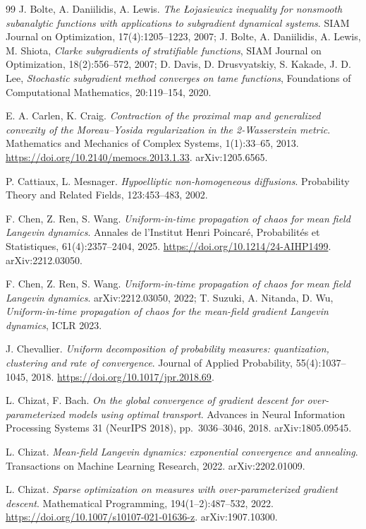 \begin{thebibliography}{99}
J. Bolte, A. Daniilidis, A. Lewis.
\emph{The {\L}ojasiewicz inequality for nonsmooth subanalytic functions with applications to subgradient dynamical
systems}.
SIAM Journal on Optimization, 17(4):1205--1223, 2007;
J. Bolte, A. Daniilidis, A. Lewis, M. Shiota, \emph{Clarke subgradients of stratifiable functions}, SIAM Journal on
Optimization, 18(2):556--572, 2007;
D. Davis, D. Drusvyatskiy, S. Kakade, J. D. Lee, \emph{Stochastic subgradient method converges on tame functions},
Foundations of Computational Mathematics, 20:119--154, 2020.

E. A. Carlen, K. Craig.
\emph{Contraction of the proximal map and generalized convexity of the Moreau--Yosida regularization in the
2-Wasserstein metric}.
Mathematics and Mechanics of Complex Systems, 1(1):33--65, 2013.
\url{https://doi.org/10.2140/memocs.2013.1.33}.
arXiv:1205.6565.

P. Cattiaux, L. Mesnager.
\emph{Hypoelliptic non-homogeneous diffusions}.
Probability Theory and Related Fields, 123:453--483, 2002.

F. Chen, Z. Ren, S. Wang.
\emph{Uniform-in-time propagation of chaos for mean field Langevin dynamics}.
Annales de l'Institut Henri Poincar\'e, Probabilit\'es et Statistiques, 61(4):2357--2404, 2025.
\url{https://doi.org/10.1214/24-AIHP1499}.
arXiv:2212.03050.

F. Chen, Z. Ren, S. Wang.
\emph{Uniform-in-time propagation of chaos for mean field Langevin dynamics}.
arXiv:2212.03050, 2022;
T. Suzuki, A. Nitanda, D. Wu, \emph{Uniform-in-time propagation of chaos for the mean-field gradient Langevin
dynamics}, ICLR 2023.

J. Chevallier.
\emph{Uniform decomposition of probability measures: quantization, clustering and rate of convergence}.
Journal of Applied Probability, 55(4):1037--1045, 2018.
\url{https://doi.org/10.1017/jpr.2018.69}.

L. Chizat, F. Bach.
\emph{On the global convergence of gradient descent for over-parameterized models using optimal transport}.
Advances in Neural Information Processing Systems 31 (NeurIPS 2018), pp.~3036--3046, 2018.
arXiv:1805.09545.

L. Chizat.
\emph{Mean-field Langevin dynamics: exponential convergence and annealing}.
Transactions on Machine Learning Research, 2022.
arXiv:2202.01009.

L. Chizat.
\emph{Sparse optimization on measures with over-parameterized gradient descent}.
Mathematical Programming, 194(1--2):487--532, 2022.
\url{https://doi.org/10.1007/s10107-021-01636-z}.
arXiv:1907.10300.


\end{thebibliography}
